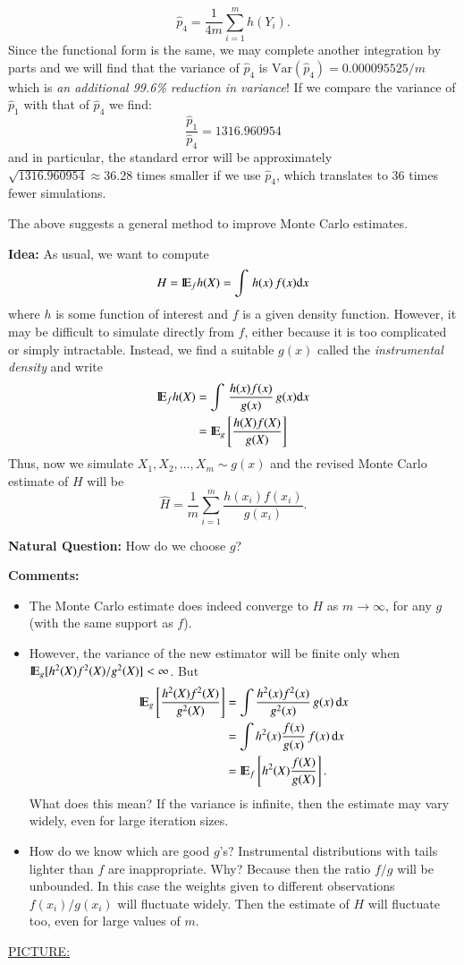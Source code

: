 \documentclass[captions=tableheading]{scrbook}
\begin{document}
\begin{enumerate}
  \[
  \hat{p}_{4} = \frac{1}{4m}\sum_{i=1}^{m} h(Y_{i}).
  \]
  Since the functional form is the same, we may complete another integration by parts and we will find that the variance of $\hat{p}_{4}$ is $\mbox{Var}(\hat{p}_{4})=0.000095525/m$ which is \emph{an additional 99.6\% reduction in variance}! If we compare the variance of $\hat{p}_{1}$ with that of $\hat{p}_{4}$ we find: 
  \[
  \frac{\hat{p}_{1}}{\hat{p}_{4}}=1316.960954
  \]
  and in particular, the standard error will be approximately $\sqrt{1316.960954}\approx 36.28$ times smaller if we use $\hat{p}_{4}$, which translates to 36 times fewer simulations.
\end{enumerate}
The above suggests a general method to improve Monte Carlo estimates.

\textbf{Idea:} As usual, we want to compute 
\[
H = \mathrm{I\hspace{-1.5pt}E}_{f}h(X) = \int\, h(x)\, f(x)\mathrm{d} x
\]
where $h$ is some function of interest and $f$ is a given density function. However, it may be difficult to simulate directly from $f$, either because it is too complicated or simply intractable. Instead, we find a suitable $g(x)$ called the \emph{instrumental density} and write 
\begin{align*}
\mathrm{I\hspace{-1.5pt}E}_{f}h(X) & =\int\,\frac{h(x)f(x)}{g(x)}\, g(x)\mathrm{d} x\\
 & =\mathrm{I\hspace{-1.5pt}E}_{g}\left[\frac{h(X)f(X)}{g(X)}\right]
\end{align*}
Thus, now we simulate \(X_{1},X_{2},\ldots,X_{m}\sim g(x)\) and the revised Monte Carlo estimate of $H$ will be 
\[
\hat{H} = \frac{1}{m}\sum_{i=1}^{m}\frac{h(x_{i})f(x_{i})}{g(x_{i})}.
\]


\textbf{Natural Question:} How do we choose $g$?

\textbf{Comments:}


\begin{itemize}
\item The Monte Carlo estimate does indeed converge to $H$ as $m \to \infty$, for any $g$ (with the same support as $f$).
\item However, the variance of the new estimator will be finite only when $\mathrm{I\hspace{-1.5pt}E}_{g}[h^{2}(X)f^{2}(X)/g^{2}(X)] < \infty$. But 
   \begin{align*}
   \mathrm{I\hspace{-1.5pt}E}_{g}\left[\frac{h^{2}(X)f^{2}(X)}{g^{2}(X)}\right] & =\int\frac{h^{2}(x)f^{2}(x)}{g^{2}(x)}\, g(x)\,\mathrm{d} x\\
   & =\int h^{2}(x)\frac{f(x)}{g(x)}\, f(x)\,\mathrm{d} x\\
   & =\mathrm{I\hspace{-1.5pt}E}_{f}\left[h^{2}(X)\frac{f(X)}{g(X)}\right].
   \end{align*}
   What does this mean? If the variance is infinite, then the estimate may vary widely, even for large iteration sizes.
\item How do we know which are good $g$'s? Instrumental distributions with tails lighter than $f$ are inappropriate. Why? Because then the ratio $f/g$ will be unbounded. In this case the weights given to different observations $f(x_{i})/g(x_{i})$ will fluctuate widely. Then the estimate of $H$ will fluctuate too, even for large values of $m$.
\end{itemize}
\underline{PICTURE:} 
\end{document}
